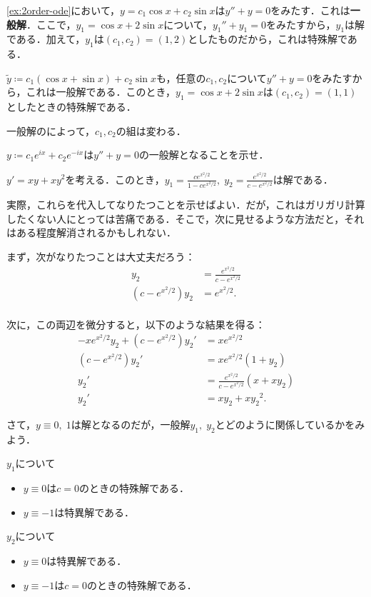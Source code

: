 \begin{example}
    \ref{ex:2order-ode}において，$y=c_1\cos x + c_2 \sin x$は$y'' + y= 0$をみたす．これは\textbf{一般解}．ここで，$y_1=\cos x + 2\sin x$について，${y_1}''+y_1 = 0$をみたすから，$y_1$は解である．加えて，$y_1$は$(c_1,c_2)=(1,2)$としたものだから，これは特殊解である．

    $\tilde{y} \coloneqq c_1(\cos x + \sin x) + c_2 \sin x$も，任意の$c_1,c_2$について$y''+y=0$をみたすから，これは一般解である．このとき，$y_1=\cos x + 2\sin x$は$(c_1,c_2)=(1,1)$としたときの特殊解である．
\end{example}

\begin{remark}
    一般解のによって，$c_1,c_2$の組は変わる．
\end{remark}

\begin{homework*}
    $y \coloneqq c_1 e^{ix} + c_2 e^{-ix}$は$y''+y=0$の一般解となることを示せ．
\end{homework*}

\begin{example}
    $y'=xy + xy^2$を考える．このとき，$y_1=\frac{ce^{x^2/2}}{1-ce^{x^2/2}}, \; y_2=\frac{e^{x^2/2}}{c-e^{x^2/2}}$は解である．

    実際，これらを代入してなりたつことを示せばよい．だが，これはガリガリ計算したくない人にとっては苦痛である．そこで，次に見せるような方法だと，それはある程度解消されるかもしれない．

    まず，次がなりたつことは大丈夫だろう：
    \begin{align*}
        y_2 &= \frac{e^{x^2/2}}{c-e^{x^2/2}} \\
        (c-e^{x^2/2})y_2 &= e^{x^2/2}. \\
    \end{align*}

    次に，この両辺を微分すると，以下のような結果を得る：
    \begin{align*}
        -xe^{x^2/2}y_2 + (c-e^{x^2/2}){y_2}' &= xe^{x^2/2} \\
        (c-e^{x^2/2}){y_2}' &= xe^{x^2/2}(1+y_2) \\
        {y_2}' &= \frac{e^{x^2/2}}{c-e^{x^2/2}}(x+xy_2) \\
        {y_2}' &= xy_2 + x{y_2}^2.
    \end{align*}

    さて，$y \equiv 0, \; 1$は解となるのだが，一般解$y_1, \; y_2$とどのように関係しているかをみよう．

    $y_1$について
    \begin{itemize}
        \item $y \equiv 0$は$c=0$のときの特殊解である．
        \item $y \equiv -1$は特異解である．
    \end{itemize}
    $y_2$について
    \begin{itemize}
        \item $y \equiv 0$は特異解である．
        \item $y \equiv -1$は$c=0$のときの特殊解である．
    \end{itemize}
\end{example}


